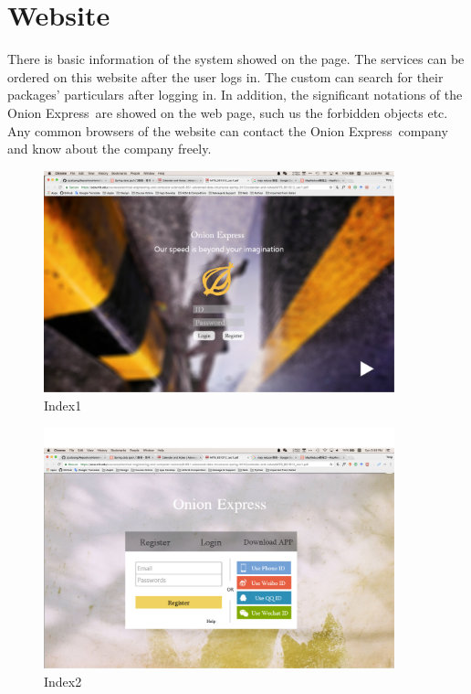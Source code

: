 \documentclass[12pt]{scrreprt}
\begin{document}
\section{Website}
There is basic information of the system showed on the page. The services can
be ordered on this website after the user logs in. The custom can search for
their packages' particulars after logging in. In addition, the significant
notations of the Onion Express\textregistered\ are showed on the web page, such us the forbidden
objects etc. Any common browsers of the website can contact the Onion
Express\textregistered\ company and know about the company freely.
\begin{figure}[htbp]
  \centering\includegraphics[width=4in]{DocumentRes/index1.png}
  \caption{Index1}
\end{figure}
\begin{figure}[htbp]
  \centering\includegraphics[width=4in]{DocumentRes/index2.png}
  \caption{Index2}
\end{figure}
\end{document}

